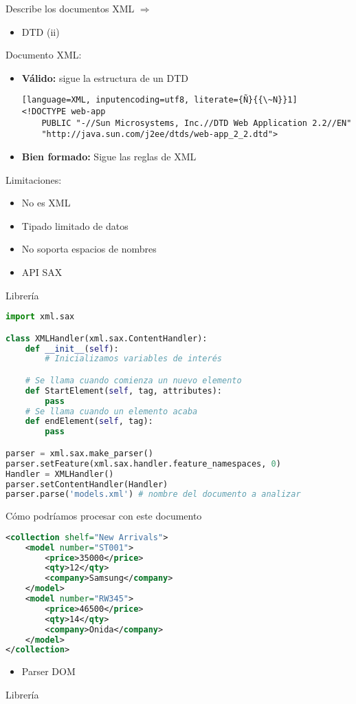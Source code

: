 Describe los documentos XML $\Longrightarrow$ 
\begin{itemize}[label=\color{red}\textbullet, leftmargin=*]
	\item \color{lightblue}DTD (ii)
\end{itemize}
Documento XML:
\begin{itemize}
\item \textbf{Válido:} sigue la estructura de un DTD
\begin{lstlisting}[language=XML, inputencoding=utf8, literate={Ñ}{{\~N}}1]
<!DOCTYPE web-app
	PUBLIC "-//Sun Microsystems, Inc.//DTD Web Application 2.2//EN"
	"http://java.sun.com/j2ee/dtds/web-app_2_2.dtd">
\end{lstlisting}
\item \textbf{Bien formado:} Sigue las reglas de XML
\end{itemize}
Limitaciones:
\begin{itemize}
\item No es XML
\item Tipado limitado de datos
\item No soporta espacios de nombres
\end{itemize}

\begin{itemize}[label=\color{red}\textbullet, leftmargin=*]
	\item \color{lightblue}API SAX
\end{itemize}

Librería \texttt{}
\begin{lstlisting}[language=python]
import xml.sax

class XMLHandler(xml.sax.ContentHandler):
    def __init__(self):
        # Inicializamos variables de interés

    # Se llama cuando comienza un nuevo elemento
    def StartElement(self, tag, attributes):
        pass
    # Se llama cuando un elemento acaba
    def endElement(self, tag):
        pass

parser = xml.sax.make_parser()
parser.setFeature(xml.sax.handler.feature_namespaces, 0)
Handler = XMLHandler()
parser.setContentHandler(Handler)
parser.parse('models.xml') # nombre del documento a analizar
\end{lstlisting}
Cómo podríamos procesar con \texttt{} este documento
\begin{lstlisting}[language=XML]
<collection shelf="New Arrivals">
    <model number="ST001">
        <price>35000</price>
        <qty>12</qty>
        <company>Samsung</company>
    </model>
    <model number="RW345">
        <price>46500</price>
        <qty>14</qty>
        <company>Onida</company>
    </model>
</collection>
\end{lstlisting}
\begin{itemize}[label=\color{red}\textbullet, leftmargin=*]
	\item \color{lightblue}Parser DOM
\end{itemize}
Librería 

